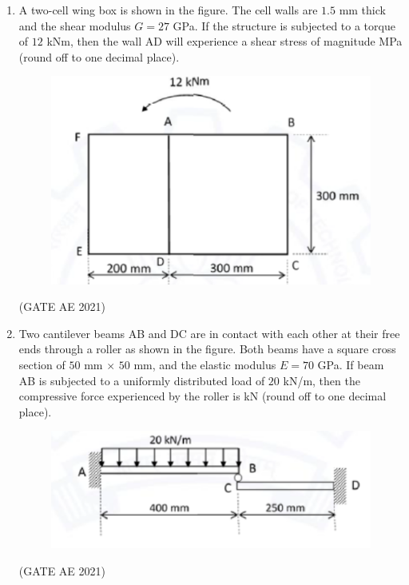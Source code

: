 \documentclass[journal,12pt,onecolumn]{IEEEtran}
\theoremstyle{remark}
\begin{document}
\begin{flushleft}
\begin{enumerate}
\item 
A two-cell wing box is shown in the figure. The cell walls are $1.5$ mm thick and the shear modulus $G = 27$ GPa. If the structure is subjected to a torque of $12$ kNm, then the wall AD will experience a shear stress of magnitude \underline{\hfill} MPa (round off to one decimal place).
\begin{figure}[H]
    \centering
    \includegraphics[width=0.5\columnwidth]{figs/50.png}
    \caption{}
    \label{fig:placeholder}
\end{figure}
\hfill (GATE AE 2021)

\item 
Two cantilever beams AB and DC are in contact with each other at their free ends through a roller as shown in the figure. Both beams have a square cross section of $50$ mm $\times$ $50$ mm, and the elastic modulus $E = 70$ GPa. If beam AB is subjected to a uniformly distributed load of $20$ kN/m, then the compressive force experienced by the roller is \underline{\hfill} kN (round off to one decimal place).
\begin{figure}[H]
    \centering
    \includegraphics[width=0.5\columnwidth]{figs/51.png}
    \caption{}
    \label{fig:placeholder}
\end{figure}
\hfill (GATE AE 2021)


\end{enumerate}
\end{flushleft}
\end{document}
